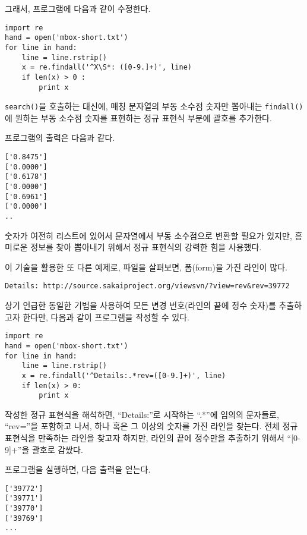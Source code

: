 
그래서, 프로그램에 다음과 같이 수정한다.

\beforeverb
\begin{verbatim}
import re
hand = open('mbox-short.txt')
for line in hand:
    line = line.rstrip()
    x = re.findall('^X\S*: ([0-9.]+)', line)
    if len(x) > 0 :
        print x
\end{verbatim}
\afterverb
%

{\tt search()}을 호출하는 대신에, 매칭 문자열의 부동 소수점 숫자만 뽑아내는 {\tt findall()}에 원하는 부동 소수점 숫자를 표현하는 정규 표현식 부분에 괄호를 추가한다.

프로그램의 출력은 다음과 같다.

\beforeverb
\begin{verbatim}
['0.8475']
['0.0000']
['0.6178']
['0.0000']
['0.6961']
['0.0000']
..
\end{verbatim}
\afterverb
%

숫자가 여전히 리스트에 있어서 문자열에서 부동 소수점으로 변환할 필요가 있지만, 흥미로운 정보를 찾아 뽑아내기 위해서 정규 표현식의 강력한 힘을 사용했다.

이 기술을 활용한 또 다른 예제로, 파일을 살펴보면, 폼(form)을 가진 라인이 많다.

\beforeverb
\begin{verbatim}
Details: http://source.sakaiproject.org/viewsvn/?view=rev&rev=39772
\end{verbatim}
\afterverb
%

상기 언급한 동일한 기법을 사용하여 모든 변경 번호(라인의 끝에 정수 숫자)를 추출하고자 한다만, 다음과 같이 프로그램을 작성할 수 있다.

\beforeverb
\begin{verbatim}
import re
hand = open('mbox-short.txt')
for line in hand:
    line = line.rstrip()
    x = re.findall('^Details:.*rev=([0-9.]+)', line)
    if len(x) > 0:
        print x
\end{verbatim}
\afterverb
%

작성한 정규 표현식을 해석하면, ``Details:''로 시작하는 ``.*''에 임의의 문자들로, ``rev=''을 포함하고 나서, 하나 혹은 그 이상의 숫자를 가진 라인을 찾는다.
전체 정규 표현식을 만족하는 라인을 찾고자 하지만, 라인의 끝에 정수만을 추출하기 위해서 ``[0-9]+''을 괄호로 감쌌다.

프로그램을 실행하면, 다음 출력을 얻는다.

\beforeverb
\begin{verbatim}
['39772']
['39771']
['39770']
['39769']
...
\end{verbatim}
\afterverb
%

